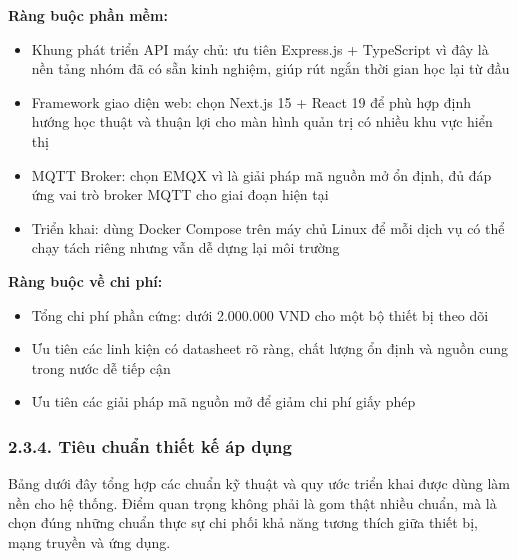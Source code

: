\documentclass[a4paper]{extarticle}
\providecommand{\tightlist}{%
  \setlength{\itemsep}{0pt}\setlength{\parskip}{0pt}}
\begin{document}
\textbf{Ràng buộc phần mềm:}

\begin{itemize}
\tightlist
\item
  Khung phát triển API máy chủ: ưu tiên Express.js + TypeScript vì đây là nền tảng
  nhóm đã có sẵn kinh nghiệm, giúp rút ngắn thời gian học lại từ đầu
\item
  Framework giao diện web: chọn Next.js 15 + React 19 để phù hợp định hướng
  học thuật và thuận lợi cho màn hình quản trị có nhiều khu vực hiển thị
\item
  MQTT Broker: chọn EMQX vì là giải pháp mã nguồn mở ổn định, đủ đáp ứng
  vai trò broker MQTT cho giai đoạn hiện tại
\item
  Triển khai: dùng Docker Compose trên máy chủ Linux để mỗi dịch vụ có
  thể chạy tách riêng nhưng vẫn dễ dựng lại môi trường
\end{itemize}

\textbf{Ràng buộc về chi phí:}

\begin{itemize}
\tightlist
\item
  Tổng chi phí phần cứng: dưới 2.000.000 VND cho một bộ thiết bị theo dõi
\item
  Ưu tiên các linh kiện có datasheet rõ ràng, chất lượng ổn định và
  nguồn cung trong nước dễ tiếp cận
\item
  Ưu tiên các giải pháp mã nguồn mở để giảm chi phí giấy phép
\end{itemize}

\subsubsection{2.3.4. Tiêu chuẩn thiết kế áp
dụng}\label{234-tiuxeau-chuux1ea9n-thiux1ebft-kux1ebf-uxe1p-dux1ee5ng}

Bảng dưới đây tổng hợp các chuẩn kỹ thuật và quy ước triển khai được dùng
làm nền cho hệ thống. Điểm quan trọng không phải là gom thật nhiều chuẩn,
mà là chọn đúng những chuẩn thực sự chi phối khả năng tương thích giữa
thiết bị, mạng truyền và ứng dụng.
\end{document}
